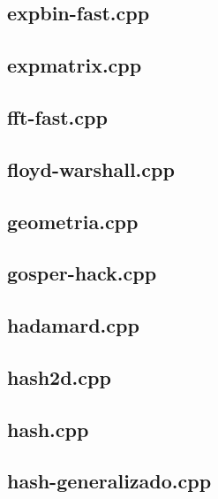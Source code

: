 \documentclass[a4paper,12pt]{article}
\begin{document}
\subsection{expbin-fast.cpp}


\subsection{expmatrix.cpp}


\subsection{fft-fast.cpp}


\subsection{floyd-warshall.cpp}


\subsection{geometria.cpp}


\subsection{gosper-hack.cpp}


\subsection{hadamard.cpp}


\subsection{hash2d.cpp}


\subsection{hash.cpp}


\subsection{hash-generalizado.cpp}

\end{document}
